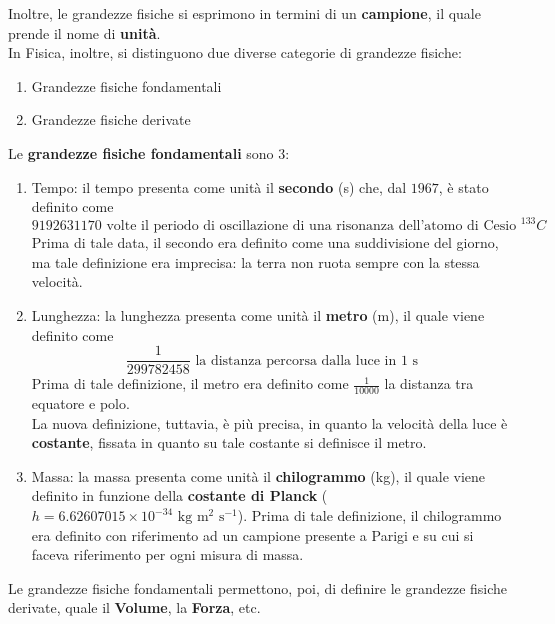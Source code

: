 \documentclass[a4paper]{extarticle}
\begin{document}
\vspace{1em}
\noindent
Inoltre, le grandezze fisiche si esprimono in termini di un \textbf{campione}, il quale prende il nome di \textbf{unità}.\\
In Fisica, inoltre, si distinguono due diverse categorie di grandezze fisiche:
\begin{enumerate}
  \item Grandezze fisiche fondamentali
  \item Grandezze fisiche derivate
\end{enumerate}
Le \textbf{grandezze fisiche fondamentali} sono $3$:
\begin{enumerate}
  \item Tempo: il tempo presenta come unità il \textbf{secondo} (s) che, dal $1967$, è stato definito come
  \[9192631170 \text{ volte il periodo di oscillazione di una risonanza dell'atomo di Cesio } ^{133}C\]
  Prima di tale data, il secondo era definito come una suddivisione del giorno, ma tale definizione era imprecisa: la terra non ruota sempre con la stessa velocità.

  \item Lunghezza: la lunghezza presenta come unità il \textbf{metro} (m), il quale viene definito come
  \[\frac{1}{299 782 458} \text{ la distanza percorsa dalla luce in $1$ s}\]
  Prima di tale definizione, il metro era definito come \(\frac{1}{10000}\) la distanza tra equatore e polo.\\
  La nuova definizione, tuttavia, è più precisa, in quanto la velocità della luce è \textbf{costante}, fissata in quanto su tale costante si definisce il metro.

  \item Massa: la massa presenta come unità il \textbf{chilogrammo} (kg), il quale viene definito in funzione della \textbf{costante di Planck} ($h = 6.62607015 \times 10^{-34} \text{ kg} \text{ m}^{2} \text{ s}^{-1}$). Prima di tale definizione, il chilogrammo era definito con riferimento ad un campione presente a Parigi e su cui si faceva riferimento per ogni misura di massa.
\end{enumerate}

\noindent
Le grandezze fisiche fondamentali permettono, poi, di definire le grandezze fisiche derivate, quale il \textbf{Volume}, la \textbf{Forza}, etc.

\vspace{1em}
\end{document}
